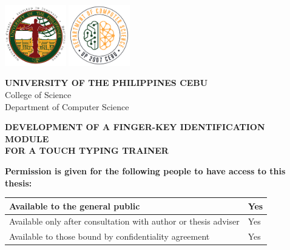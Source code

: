 \documentclass{report}
\begin{document}
\newpage

\begin{center}

	\hspace{0pt}
	\vfill

	\includegraphics[width=0.2\textwidth]{upc.png}
	\includegraphics[width=0.2\textwidth]{dcs.png}
	\par\vspace{0.25cm}

	\textbf{\uppercase{University of the Philippines Cebu}}\\
	College of Science\\
	Department of Computer Science

	\par\vspace{1cm}

	\textbf{\uppercase{Development of a Finger-Key Identification Module\\for a Touch Typing Trainer}}

	\par\vspace{1cm}

	\textbf{Permission is given for the following people to have access to this thesis:}

	\par\vspace{0.25cm}

	\begin{tabular}{ | P{0.8\textwidth} | P{0.1\textwidth} | }
		\hline
		Available to the general public                                 & Yes \\
		\hline
		Available only after consultation with author or thesis adviser & Yes \\
		\hline
		Available to those bound by confidentiality agreement           & Yes \\
		\hline
	\end{tabular}
	\par\vspace{1cm}



\end{center}
\end{document}
